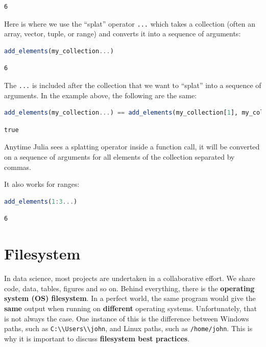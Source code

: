 \documentclass[
  notoc %
]{tufte-book}
\newcommand{\passthrough}[1]{#1}
\begin{document}
\begin{lstlisting}[language=Output]
6
\end{lstlisting}

Here is where we use the ``splat'' operator
\passthrough{\lstinline!...!} which takes a collection (often an array,
vector, tuple, or range) and converts it into a sequence of arguments:

\begin{lstlisting}[language=Julia]
add_elements(my_collection...)
\end{lstlisting}

\begin{lstlisting}[language=Output]
6
\end{lstlisting}

The \passthrough{\lstinline!...!} is included after the collection that
we want to ``splat'' into a sequence of arguments. In the example above,
the following are the same:

\begin{lstlisting}[language=Julia]
add_elements(my_collection...) == add_elements(my_collection[1], my_collection[2], my_collection[3])
\end{lstlisting}

\begin{lstlisting}[language=Output]
true
\end{lstlisting}

Anytime Julia sees a splatting operator inside a function call, it will
be converted on a sequence of arguments for all elements of the
collection separated by commas.

It also works for ranges:

\begin{lstlisting}[language=Julia]
add_elements(1:3...)
\end{lstlisting}

\begin{lstlisting}[language=Output]
6
\end{lstlisting}

\hypertarget{sec:filesystem}{%
\section{Filesystem}\label{sec:filesystem}}

In data science, most projects are undertaken in a collaborative effort.
We share code, data, tables, figures and so on. Behind everything, there
is the \textbf{operating system (OS) filesystem}. In a perfect world,
the same program would give the \textbf{same} output when running on
\textbf{different} operating systems. Unfortunately, that is not always
the case. One instance of this is the difference between Windows paths,
such as \passthrough{\lstinline!C:\\Users\\john!}, and Linux paths, such
as \passthrough{\lstinline!/home/john!}. This is why it is important to
discuss \textbf{filesystem best practices}.
\end{document}
